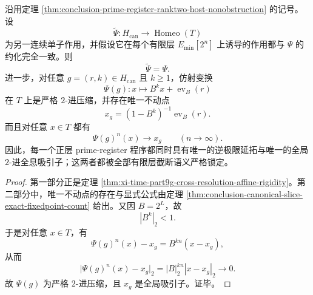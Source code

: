 \begin{theorem}[跨分辨率刚性与正层程序的唯一全局吸引子]\label{thm:conclusion-prime-register-crossresolution-rigidity-attractor}
沿用定理 \ref{thm:conclusion-prime-register-ranktwo-host-nonobstruction} 的记号。设
\[
\widetilde\Psi:H_{\mathrm{can}}\to \operatorname{Homeo}(T)
\]
为另一连续单子作用，并假设它在每个有限层 \(E_{\min}[2^n]\) 上诱导的作用都与 \(\Psi\) 的约化完全一致。则
\[
\widetilde\Psi=\Psi.
\]
进一步，对任意 \(g=(r,k)\in H_{\mathrm{can}}\) 且 \(k\ge 1\)，仿射变换
\[
\Psi(g):x\longmapsto B^k x+\operatorname{ev}_B(r)
\]
在 \(T\) 上是严格 \(2\)-进压缩，并存在唯一不动点
\[
x_g=(1-B^k)^{-1}\operatorname{ev}_B(r).
\]
而且对任意 \(x\in T\) 都有
\[
\Psi(g)^n(x)\longrightarrow x_g
\qquad (n\to\infty).
\]
因此，每一个正层 prime-register 程序都同时具有唯一的逆极限延拓与唯一的全局 \(2\)-进全息吸引子；这两者都被全部有限层截断语义严格锁定。
\end{theorem}
\begin{proof}
第一部分正是定理 \ref{thm:xi-time-part9g-cross-resolution-affine-rigidity}。第二部分中，唯一不动点的存在与显式公式由定理 \ref{thm:conclusion-canonical-slice-exact-fixedpoint-count} 给出。又因 \(B=2^L\)，故
\[
|B^k|_2<1.
\]
于是对任意 \(x\in T\)，有
\[
\Psi(g)^n(x)-x_g
=
B^{kn}(x-x_g),
\]
从而
\[
\bigl|\Psi(g)^n(x)-x_g\bigr|_2
=
|B|_2^{kn}|x-x_g|_2
\longrightarrow 0.
\]
故 \(\Psi(g)\) 为严格 \(2\)-进压缩，且 \(x_g\) 是全局吸引子。证毕。
\end{proof}

